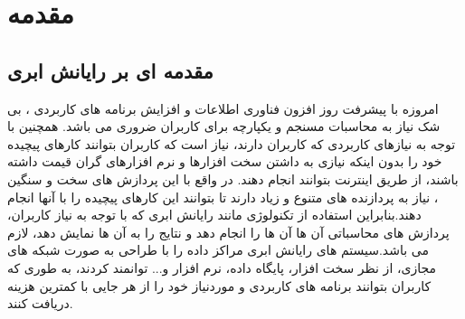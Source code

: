 \chapter{مقدمه}
\section{ مقدمه ای بر رایانش ابری}
 امروزه با پیشرفت روز افزون فناوری اطلاعات و افزایش برنامه های کاربردی ، 
 بی شک نیاز به محاسبات مسنجم و یکپارچه برای کاربران ضروری می باشد.
 همچنین با توجه به نیازهای کاربردی که کاربران دارند، 
 نیاز است که کاربران بتوانند کارهای پیچیده خود را بدون  اینکه 
 نیازی به داشتن سخت افزارها و نرم افزارهای گران قیمت داشته باشند، 
 از طریق اینترنت بتوانند انجام دهند. در واقع با این پردازش های سخت و سنگین ، 
 نیاز به پردازنده های متنوع و زیاد دارند تا بتوانند این کارهای پیچیده را با آنها انجام دهند.بنابراین استفاده از تکنولوژی مانند رایانش ابری که با توجه به نیاز کاربران، پردازش های محاسباتی آن ها آن ها را انجام دهد و نتایج را به آن ها 
 نمایش دهد، لازم می باشد.سیستم های رایانش ابری مراکز داده را با طراحی به صورت شبکه های مجازی، از نظر سخت افزار، پایگاه داده، نرم افزار و... توانمند کردند، 
 به طوری که کاربران بتوانند برنامه های کاربردی و موردنیاز خود را از هر جایی  با کمترین هزینه دریافت کنند.
  \cite{num2}
